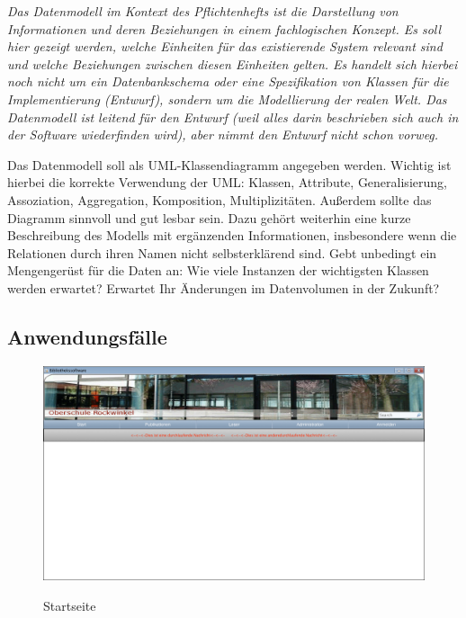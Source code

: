 \documentclass[fontsize=12pt,paper=a4,twoside]{scrartcl}
\begin{document}
  {\em Das Datenmodell im Kontext des Pflichtenhefts ist {\glqq}die
  Darstellung von Informationen und deren Beziehungen in einem
  fachlogischen Konzept{\grqq}. Es soll hier gezeigt werden, welche
  Einheiten für das existierende System relevant sind und welche
  Beziehungen zwischen diesen Einheiten gelten. Es handelt sich
  hierbei noch nicht um ein Datenbankschema oder eine Spezifikation
  von Klassen für die Implementierung (Entwurf), sondern um die
  Modellierung der realen Welt. Das Datenmodell ist leitend für den
  Entwurf (weil alles darin beschrieben sich auch in der Software 
  wiederfinden wird), aber nimmt den Entwurf nicht schon vorweg.
  
  Das Datenmodell soll als UML-Klassendiagramm angegeben werden.
  Wichtig ist hierbei die korrekte Verwendung der UML: Klassen,
  Attribute, Generalisierung, Assoziation, Aggregation, Komposition,
  Multiplizitäten. Außerdem sollte das Diagramm sinnvoll und gut
  lesbar sein. Dazu gehört weiterhin eine kurze Beschreibung des
  Modells mit ergänzenden Informationen, insbesondere wenn die
  Relationen durch ihren Namen nicht selbsterklärend sind. Gebt
  unbedingt ein Mengengerüst für die Daten an: Wie viele Instanzen der
  wichtigsten Klassen werden erwartet? Erwartet Ihr Änderungen im
  Datenvolumen in der Zukunft?}


\subsection{Anwendungsfälle}
\begin{figure}[htbp]
\caption{Startseite}
\includegraphics[width=1\textwidth]{WebApp-Screens/Startscreen-loggedOut.png}
  \label{startseite}
\end{figure}
\end{document}
